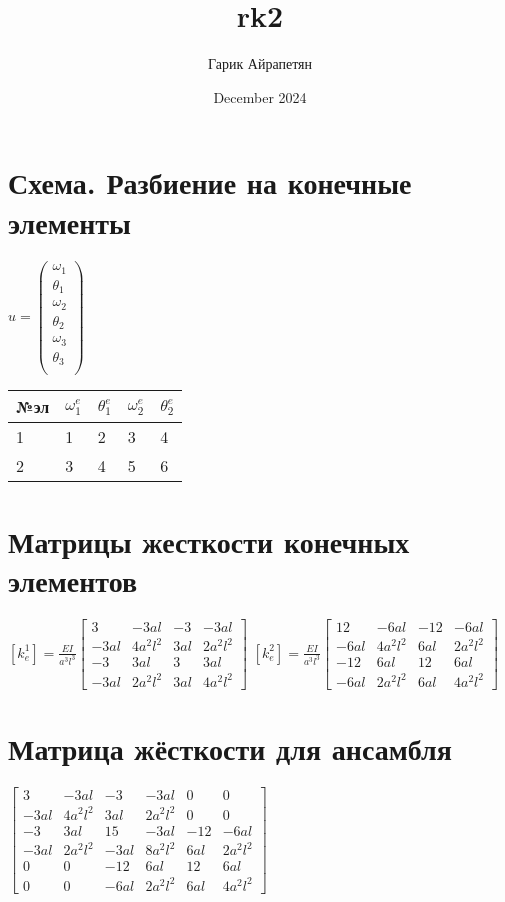 \documentclass{article}
\title{rk2}
\author{Гарик Айрапетян}
\date{December 2024}
\begin{document}
\section{Схема. Разбиение на конечные элементы}

${u} = \begin{pmatrix}
\omega_{1} \\
\theta_{1} \\
\omega_{2} \\
\theta_{2} \\
\omega_{3} \\
\theta_{3} \\
\end{pmatrix}$ \quad \quad
\begin{tabular}{|l|l|l|l|l|}
\hline
№эл & $\omega_{1}^e$ & $\theta_{1}^e$ & $\omega_{2}^e$ & $\theta_{2}^e$ \\ \hline
1 & 1  & 2 & 3 & 4  \\ \hline
2 & 3 & 4 & 5 & 6 \\ \hline
\end{tabular}
\section{Матрицы жесткости конечных элементов}
\([k_{e}^1] =
\frac{EI}{a^{3} l^{3}}
\left[\begin{matrix}3 & - 3 a l & -3 & - 3 a l\\- 3 a l & 4 a^{2} l^{2} & 3 a l & 2 a^{2} l^{2}\\-3 & 3 a l & 3 & 3 a l\\- 3 a l & 2 a^{2} l^{2} & 3 a l & 4 a^{2} l^{2}\end{matrix}\right]
\) \quad
\([k_{e}^2] =
\frac{EI}{a^{3} l^{3}}
\left[\begin{matrix}12 & - 6 a l & -12 & - 6 a l\\- 6 a l & 4 a^{2} l^{2} & 6 a l & 2 a^{2} l^{2}\\-12 & 6 a l & 12 & 6 a l\\- 6 a l & 2 a^{2} l^{2} & 6 a l & 4 a^{2} l^{2}\end{matrix}\right]
\)
\section{Матрица жёсткости для ансамбля}
$
\left[\begin{matrix}3 & - 3 a l & -3 & - 3 a l & 0 & 0\\- 3 a l & 4 a^{2} l^{2} & 3 a l & 2 a^{2} l^{2} & 0 & 0\\-3 & 3 a l & 15 & - 3 a l & -12 & - 6 a l\\- 3 a l & 2 a^{2} l^{2} & - 3 a l & 8 a^{2} l^{2} & 6 a l & 2 a^{2} l^{2}\\0 & 0 & -12 & 6 a l & 12 & 6 a l\\0 & 0 & - 6 a l & 2 a^{2} l^{2} & 6 a l & 4 a^{2} l^{2}\end{matrix}\right]
$
\end{document}
